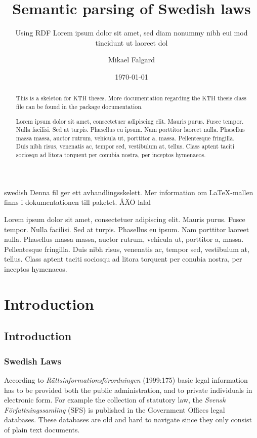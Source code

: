 \documentclass[a4paper,11pt]{kth-mag}
\title{Semantic parsing of Swedish laws}
\subtitle{Using RDF Lorem ipsum dolor sit amet, sed diam nonummy nibh eui
              mod tincidunt ut laoreet dol}
\author{Mikael Falgard}
\date{\today}
\begin{document}
\frontmatter
\pagestyle{empty}
\removepagenumbers
\maketitle
{}
\begin{abstract}
  This is a skeleton for KTH theses. More documentation
  regarding the KTH thesis class file can be found in
  the package documentation.

Lorem ipsum dolor sit amet, consectetuer adipiscing elit. Mauris
purus. Fusce tempor. Nulla facilisi. Sed at turpis. Phasellus eu
ipsum. Nam porttitor laoreet nulla. Phasellus massa massa, auctor
rutrum, vehicula ut, porttitor a, massa. Pellentesque fringilla. Duis
nibh risus, venenatis ac, tempor sed, vestibulum at, tellus. Class
aptent taciti sociosqu ad litora torquent per conubia nostra, per
inceptos hymenaeos.
\end{abstract}
\clearpage
\begin{foreignabstract}{swedish}
  Denna fil ger ett avhandlingsskelett.
  Mer information om \LaTeX-mallen finns i
  dokumentationen till paketet. ÅÄÖ lalal

Lorem ipsum dolor sit amet, consectetuer adipiscing elit. Mauris
purus. Fusce tempor. Nulla facilisi. Sed at turpis. Phasellus eu
ipsum. Nam porttitor laoreet nulla. Phasellus massa massa, auctor
rutrum, vehicula ut, porttitor a, massa. Pellentesque fringilla. Duis
nibh risus, venenatis ac, tempor sed, vestibulum at, tellus. Class
aptent taciti sociosqu ad litora torquent per conubia nostra, per
inceptos hymenaeos.
\end{foreignabstract}
\clearpage
\tableofcontents*
\mainmatter
\pagestyle{newchap}

\part{Introduction}
\chapter{Introduction}

\section{Swedish Laws}

According to \textit{Rättsinformationsförordningen} (1999:175) basic legal information has to be provided both the public administration, and to private individuals in electronic form. For example the collection of statutory law, the \textit{Svensk Författningssamling} (SFS) is published in the Government Offices legal databases. These databases are old and hard to navigate since they only consist of plain text documents.
\end{document}
